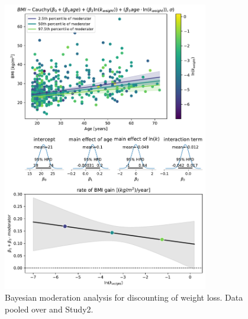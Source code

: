 \documentclass[12pt, a4paper]{article}
\begin{document}
\begin{figure} 
	\centering
	\includegraphics[width=0.8\textwidth]{meta_analysis/meta analysis bmi~age*weight.pdf} 
	\caption{Bayesian moderation analysis for discounting of weight loss. Data pooled over \cite{VeillardVincent2020} and Study2.}
	\label{fig:meta_weight}
\end{figure}
\end{document}
